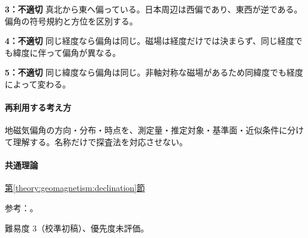 \noindent\textbf{3：不適切} 真北から東へ偏っている。日本周辺は西偏であり、東西が逆である。偏角の符号規約と方位を区別する。\par

\noindent\textbf{4：不適切} 同じ経度なら偏角は同じ。磁場は経度だけでは決まらず、同じ経度でも緯度に伴って偏角が異なる。\par

\noindent\textbf{5：不適切} 同じ緯度なら偏角は同じ。非軸対称な磁場があるため同緯度でも経度によって変わる。\par

\paragraph{再利用する考え方} 地磁気偏角の方向・分布・時点を、測定量・推定対象・基準面・近似条件に分けて理解する。名称だけで探査法を対応させない。

\paragraph{共通理論} \hyperref[theory:geomagnetism:declination]{第\ref*{theory:geomagnetism:declination}節}

\par 参考：\cite{gsi_declination2015}。

\par 難易度 3（校準初稿）、優先度未評価。
